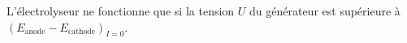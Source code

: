 ﻿\documentclass[a4paper]{article}
\begin{document}
\pagestyle{fancy}
\fancyhf{}
\setlength{\headheight}{15pt}

\begin{center}
	\large{}
\end{center}


L'électrolyseur ne fonctionne que si la tension \(U\) du générateur est supérieure à \((E_{\mathrm{anode}}-E_{\mathrm{cathode}})_{I=0}\).
\end{document}
